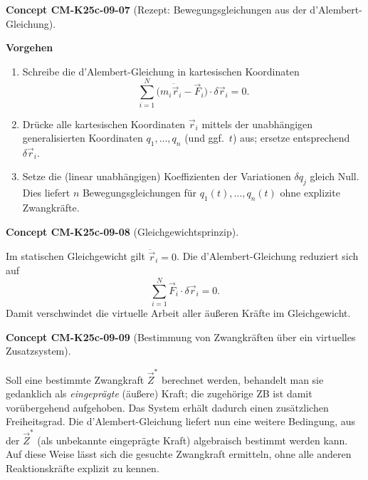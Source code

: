 \documentclass[10pt, letterpaper]{article}
\newcommand{\CustomHeading}[3]{%
  \par\medskip\noindent%
  \textbf{#1 #2} \textnormal{(#3)}.\enskip%
}
\newenvironment{CONC}[2]{\CustomHeading{Concept}{#1}{#2}}{}
\begin{document}
\begin{CONC}{CM-K25c-09-07}{Rezept: Bewegungsgleichungen aus der d’Alembert-Gleichung}
\textbf{Vorgehen}\\[-4pt]
\begin{enumerate}
  \item Schreibe die d’Alembert-Gleichung in kartesischen Koordinaten
        \[
          \sum_{i=1}^{N}
            \bigl(m_i\ddot{\vec r}_i-\vec F_i\bigr)\!\cdot\!\delta\vec r_i = 0 .
        \]
  \item Drücke alle kartesischen Koordinaten $\vec r_i$ mittels der
        unabhängigen generalisierten Koordinaten
        $q_1,\dots,q_n$ (und ggf.\ $t$) aus; ersetze entsprechend
        $\delta\vec r_i$.
  \item Setze die (linear unabhängigen) Koeffizienten der Variationen
        $\delta q_j$ gleich Null.  
        Dies liefert $n$ Bewegungsgleichungen für
        $q_1(t),\dots,q_n(t)$ ohne explizite Zwangkräfte.
\end{enumerate}
\end{CONC}

\begin{CONC}{CM-K25c-09-08}{Gleichgewichtsprinzip}
Im statischen Gleichgewicht gilt $\ddot{\vec r}_i=0$. Die d’Alembert-Gleichung reduziert sich auf
\[
  \sum_{i=1}^{N}\vec F_i\!\cdot\!\delta\vec r_i = 0 .
\]
Damit verschwindet die virtuelle Arbeit aller äußeren Kräfte
im Gleichgewicht.
\end{CONC}

\begin{CONC}{CM-K25c-09-09}{Bestimmung von Zwangkräften über ein virtuelles Zusatz­system}
Soll eine bestimmte Zwangkraft $\vec Z^{\ast}$ berechnet werden, behandelt man sie gedanklich als
\emph{eingeprägte} (äußere) Kraft; die zugehörige ZB ist damit vorübergehend aufgehoben. Das System erhält dadurch einen zusätzlichen Freiheitsgrad. Die d’Alembert-Gleichung liefert nun eine weitere Bedingung, aus der $\vec Z^{\ast}$ (als unbekannte eingeprägte Kraft) algebraisch bestimmt werden kann. Auf diese Weise lässt sich die gesuchte Zwangkraft ermitteln, ohne alle anderen Reaktionskräfte explizit zu kennen.
\end{CONC}
\end{document}
